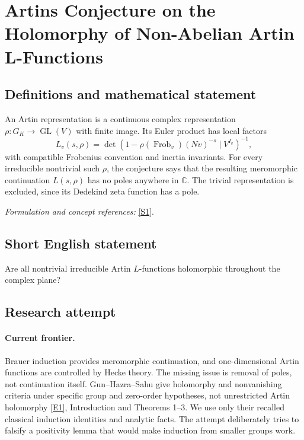 \documentclass[11pt,a4paper]{article}
\newcommand{\C}{\mathbb{C}}
\newcommand{\sref}[2]{\hyperlink{source:#1:#2}{[S#2]}}
\newcommand{\eref}[2]{\hyperlink{extra:#1:#2}{[E#2]}}
\newif\ifshowcatalogue
\newcommand{\cataloguescope}[1]{\ifshowcatalogue
 \paragraph{Exact scope in the supplied catalogue.}
 \begin{quote}\small #1\end{quote}\fi}
\numberwithin{equation}{section}
\begin{document}
\setcounter{section}{0}
\clearpage
\section*{\texorpdfstring{Artins Conjecture on the Holomorphy of Non-Abelian Artin L-Functions}{Artins Conjecture on the Holomorphy of Non-Abelian Artin L-Functions}}\label{30006705}
\subsection{Definitions and mathematical statement}
An Artin representation is a continuous complex representation $\rho:G_K\to\operatorname{GL}(V)$ with finite image. Its Euler product has local factors
\[
 L_v(s,\rho)=\det(1-\rho(\operatorname{Frob}_v)(Nv)^{-s}\mid V^{I_v})^{-1},
\]
with compatible Frobenius convention and inertia invariants. For every irreducible nontrivial such $\rho$, the conjecture says that the resulting meromorphic continuation $L(s,\rho)$ has no poles anywhere in $\C$. The trivial representation is excluded, since its Dedekind zeta function has a pole.
\par\smallskip\textit{Formulation and concept references:} \sref{30006705}{1}.
\cataloguescope{Prove that every non-trivial irreducible Artin L-function L(s, rho) associated to a Galois representation rho is an entire holomorphic function on the whole complex plane.}
\subsection{Short English statement}
Are all nontrivial irreducible Artin $L$-functions holomorphic throughout the complex plane?
\subsection{Research attempt}

\paragraph{Current frontier.}
Brauer induction provides meromorphic continuation, and one-dimensional Artin functions are controlled by Hecke theory. The missing issue is removal of poles, not continuation itself. Gun--Hazra--Sahu give holomorphy and nonvanishing criteria under specific group and zero-order hypotheses, not unrestricted Artin holomorphy \eref{30006705}{1}, Introduction and Theorems 1--3. We use only their recalled classical induction identities and analytic facts. The attempt deliberately tries to falsify a positivity lemma that would make induction from smaller groups work.
\end{document}
